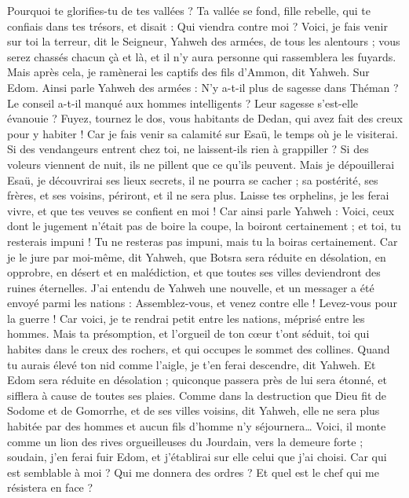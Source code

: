 \begin{multicols}{2}
Pourquoi te glorifies-tu de tes vallées ? Ta vallée se fond, fille rebelle, qui te confiais dans tes trésors, et disait : Qui viendra contre moi ?
Voici, je fais venir sur toi la terreur, dit le Seigneur, Yahweh des armées, de tous les alentours ; vous serez chassés chacun çà et là, et il n'y aura personne qui rassemblera les fuyards.
Mais après cela, je ramènerai les captifs des fils d'Ammon, dit Yahweh.
Sur Edom. Ainsi parle Yahweh des armées : N'y a-t-il plus de sagesse dans Théman ? Le conseil a-t-il manqué aux hommes intelligents ? Leur sagesse s'est-elle évanouie ?
Fuyez, tournez le dos, vous habitants de Dedan, qui avez fait des creux pour y habiter ! Car je fais venir sa calamité sur Esaü, le temps où je le visiterai.
Si des vendangeurs entrent chez toi, ne laissent-ils rien à grappiller ? Si des voleurs viennent de nuit, ils ne pillent que ce qu'ils peuvent.
Mais je dépouillerai Esaü, je découvrirai ses lieux secrets, il ne pourra se cacher ; sa postérité, ses frères, et ses voisins, périront, et il ne sera plus.
Laisse tes orphelins, je les ferai vivre, et que tes veuves se confient en moi !
Car ainsi parle Yahweh : Voici, ceux dont le jugement n'était pas de boire la coupe, la boiront certainement ; et toi, tu resterais impuni ! Tu ne resteras pas impuni, mais tu la boiras certainement.
Car je le jure par moi-même, dit Yahweh, que Botsra sera réduite en désolation, en opprobre, en désert et en malédiction, et que toutes ses villes deviendront des ruines éternelles.
J'ai entendu de Yahweh une nouvelle, et un messager a été envoyé parmi les nations : Assemblez-vous, et venez contre elle ! Levez-vous pour la guerre !
Car voici, je te rendrai petit entre les nations, méprisé entre les hommes.
Mais ta présomption, et l'orgueil de ton cœur t'ont séduit, toi qui habites dans le creux des rochers, et qui occupes le sommet des collines. Quand tu aurais élevé ton nid comme l'aigle, je t'en ferai descendre, dit Yahweh.
Et Edom sera réduite en désolation ; quiconque passera près de lui sera étonné, et sifflera à cause de toutes ses plaies.
Comme dans la destruction que Dieu fit de Sodome et de Gomorrhe, et de ses villes voisins, dit Yahweh, elle ne sera plus habitée par des hommes et aucun fils d'homme n'y séjournera…
Voici, il monte comme un lion des rives orgueilleuses du Jourdain, vers la demeure forte ; soudain, j'en ferai fuir Edom, et j'établirai sur elle celui que j'ai choisi. Car qui est semblable à moi ? Qui me donnera des ordres ? Et quel est le chef qui me résistera en face ?

\end{multicols}
